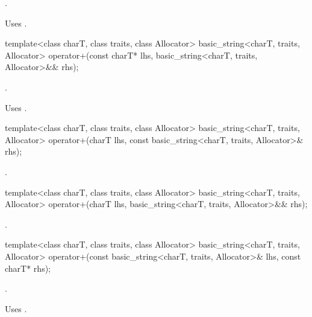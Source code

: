 \begin{itemdescr}
\pnum
\returns
{}.

\pnum
\remarks
Uses
.
\end{itemdescr}

%
\begin{itemdecl}
template<class charT, class traits, class Allocator>
  basic_string<charT, traits, Allocator>
    operator+(const charT* lhs,
              basic_string<charT, traits, Allocator>&& rhs);
\end{itemdecl}

\begin{itemdescr}
\pnum
\returns
{}.

\pnum
\remarks
Uses
.
\end{itemdescr}

%
\begin{itemdecl}
template<class charT, class traits, class Allocator>
  basic_string<charT, traits, Allocator>
    operator+(charT lhs,
              const basic_string<charT, traits, Allocator>& rhs);
\end{itemdecl}

\begin{itemdescr}
\pnum
\returns
{}.
\end{itemdescr}

%
\begin{itemdecl}
template<class charT, class traits, class Allocator>
  basic_string<charT, traits, Allocator>
    operator+(charT lhs,
              basic_string<charT, traits, Allocator>&& rhs);
\end{itemdecl}

\begin{itemdescr}
\pnum
\returns
{}.
\end{itemdescr}

%
\begin{itemdecl}
template<class charT, class traits, class Allocator>
  basic_string<charT, traits, Allocator>
    operator+(const basic_string<charT, traits, Allocator>& lhs,
              const charT* rhs);
\end{itemdecl}

\begin{itemdescr}
\pnum
\returns
{}.

\pnum
\remarks
Uses
.
\end{itemdescr}


